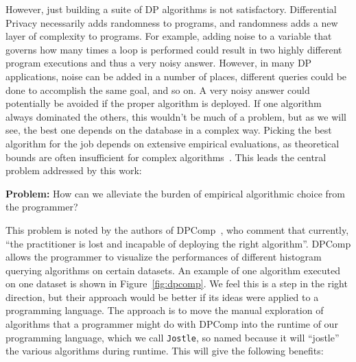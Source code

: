 \documentclass[11pt]{report}
\newcommand{\Jostle}{\texttt{Jostle}}
\begin{document}
However, just building a suite of DP algorithms is not satisfactory. Differential Privacy necessarily adds randomness to programs, and randomness adds a new layer of complexity to programs. For example, adding noise to a variable that governs how many times a loop is performed could result in two highly different program executions and thus a very noisy answer. However, in many DP applications, noise can be added in a number of places, different queries could be done to accomplish the same goal, and so on. A very noisy answer could potentially be avoided if the proper algorithm is deployed. If one algorithm always dominated the others, this wouldn't be much of a problem, but as we will see, the best one depends on the database in a complex way. Picking the best algorithm for the job depends on extensive empirical evaluations, as theoretical bounds are often insufficient for complex algorithms~\cite{Hay:2016}. This leads the central problem addressed by this work:

\textbf{Problem:} How can we alleviate the burden of empirical algorithmic choice from the programmer? 

This problem is noted by the authors of DPComp~\cite{Hay:2016}, who comment that currently, ``the practitioner is lost and incapable of deploying the right algorithm''. DPComp allows the programmer to visualize the performances of different histogram querying algorithms on certain datasets. An example of one algorithm executed on one dataset is shown in Figure~\ref{fig:dpcomp}. We feel this is a step in the right direction, but their approach would be better if its ideas were applied to a programming language. The approach is to move the manual exploration of algorithms that a programmer might do with DPComp into the runtime of our programming language, which we call \Jostle{}, so named because it will ``jostle'' the various algorithms during runtime. This will give the following benefits:
\end{document}
